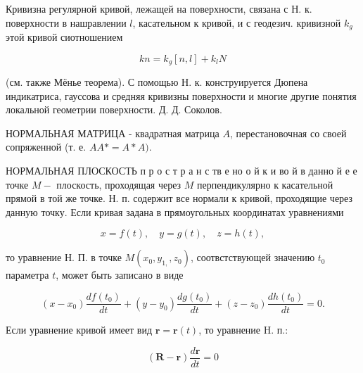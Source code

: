 \documentclass[10pt]{article}
\begin{document}
Кривизна регулярной кривой, лежащей на поверхности, связана с Н. к. поверхности в нашравлении $l$, касательном к кривой, и с геодезич. кривизной $k_{g}$ этой кривой сиотношением



\[

k n=k_{g}[n, l]+k_{l} N

\]



(см. также Мёнье теорема). С помощью Н. к. конструируется Дюпена индикатриса, гауссова и средняя кривизны поверхности и многие другие понятия локальной геометрии поверхности. Д. Д. Соколов.



НОРМАЛЬНАЯ МАТРИЦА - квадратная матрица $A$, перестановочная со своей сопряженной (т. е. $A A *=A * A)$.



НОРМАЛЬНАЯ ПЛОСКОСТЬ п р о с т р а н с тв е но о й к и во й в данно й е е точке $M-$ плоскость, проходящая через $M$ перпендикулярно к касательной прямой в той же точке. Н. п. содержит все нормали к кривой, проходящие через данную точку. Если кривая задана в прямоугольных координатах уравнениями



\[

x=f(t), \quad y=g(t), \quad z=h(t),

\]



то уравнение Н. П. в точке $M\left(x_{0}, y_{1,}, z_{0}\right)$, соотвстствующей значению $t_{0}$ параметра $t$, может быть записано в виде



\[

\left(x-x_{0}\right) \frac{d f\left(t_{0}\right)}{d t}+\left(y-y_{0}\right) \frac{d g\left(t_{0}\right)}{d t}+\left(z-z_{0}\right) \frac{d h\left(t_{0}\right)}{d t}=0 .

\]



Если уравнение кривой имеет вид $\boldsymbol{r}=\boldsymbol{r}(t)$, то уравнение H. п.:



\[

(\boldsymbol{R}-\boldsymbol{r}) \frac{d \boldsymbol{r}}{d t}=0

\]
\end{document}
